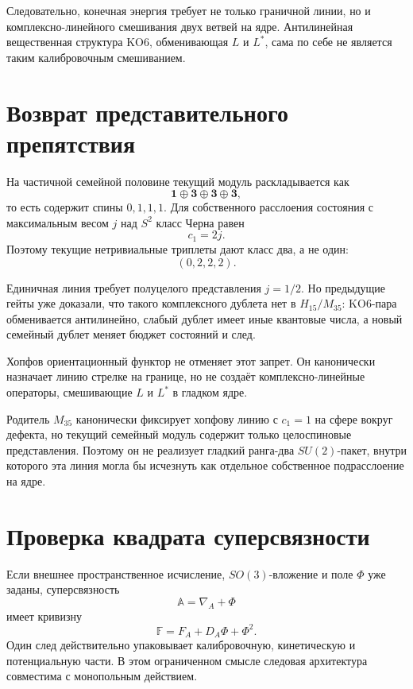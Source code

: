 Следовательно, конечная энергия требует не только граничной линии, но и
комплексно-линейного смешивания двух ветвей на ядре. Антилинейная
вещественная структура KO6, обменивающая $L$ и $L^*$, сама по себе не
является таким калибровочным смешиванием.

\section{Возврат представительного препятствия}

На частичной семейной половине текущий модуль раскладывается как
\begin{equation}
 \mathbf1\oplus\mathbf3\oplus\mathbf3\oplus\mathbf3,
\end{equation}
то есть содержит спины $0,1,1,1$. Для собственного расслоения состояния
с максимальным весом $j$ над $S^2$ класс Черна равен
\begin{equation}
 c_1=2j.
 \label{eq:v5-spin-j-chern}
\end{equation}
Поэтому текущие нетривиальные триплеты дают класс два, а не один:
\begin{equation}
 (0,2,2,2).
\end{equation}

Единичная линия требует полуцелого представления $j=1/2$. Но предыдущие
гейты уже доказали, что такого комплексного дублета нет в $H_{15}/M_{35}$:
KO6-пара обменивается антилинейно, слабый дублет имеет иные квантовые
числа, а новый семейный дублет меняет бюджет состояний и след.

Хопфов ориентационный функтор не отменяет этот запрет. Он канонически
назначает линию стрелке на границе, но не создаёт комплексно-линейные
операторы, смешивающие $L$ и $L^*$ в гладком ядре.

\begin{theorem}
Родитель $M_{35}$ канонически фиксирует хопфову линию с $c_1=1$ на сфере
вокруг дефекта, но текущий семейный модуль содержит только целоспиновые
представления. Поэтому он не реализует гладкий ранга-два $SU(2)$-пакет,
внутри которого эта линия могла бы исчезнуть как отдельное собственное
подрасслоение на ядре.
\end{theorem}

\section{Проверка квадрата суперсвязности}

Если внешнее пространственное исчисление, $SO(3)$-вложение и поле $\Phi$
уже заданы, суперсвязность
\begin{equation}
 \mathbb A=\nabla_A+\Phi
\end{equation}
имеет кривизну
\begin{equation}
 \mathbb F=F_A+D_A\Phi+\Phi^2.
\end{equation}
Один след действительно упаковывает калибровочную, кинетическую и
потенциальную части. В этом ограниченном смысле следовая архитектура
совместима с монопольным действием.

